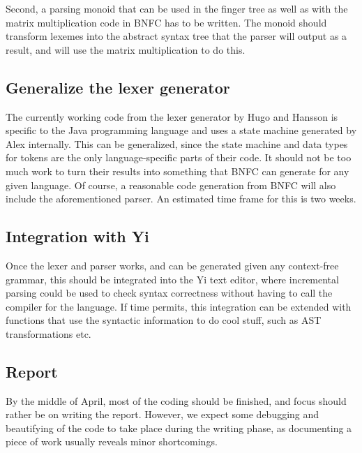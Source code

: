 \documentclass[a4paper,12pt]{article}
\begin{document}
Second, a parsing monoid that can be used in the finger tree as well as with the
matrix multiplication code in BNFC has to be written. The monoid should
transform lexemes into the abstract syntax tree that the parser will output as a
result, and will use the matrix multiplication to do this.

\subsection*{Generalize the lexer generator}
The currently working code from the lexer generator by Hugo and Hansson is
specific to the Java programming language and uses a state machine generated by
Alex internally. This can be generalized, since the state machine and data types
for tokens are the only language-specific parts of their code. It should not be
too much work to turn their results into something that BNFC can generate for
any given language. Of course, a reasonable code generation from BNFC will also
include the aforementioned parser. An estimated time frame for this is two
weeks.

\subsection*{Integration with Yi}
Once the lexer and parser works, and can be generated given any context-free
grammar, this should be integrated into the Yi text editor\cite{yieditor}, where
incremental parsing could be used to check syntax correctness without having to
call the compiler for the language. If time permits, this integration can be
extended with functions that use the syntactic information to do cool stuff,
such as AST transformations etc. 

\subsection*{Report}
By the middle of April, most of the coding should be finished, and focus should
rather be on writing the report. However, we expect some debugging and
beautifying of the code to take place during the writing phase, as documenting a
piece of work usually reveals minor shortcomings.
\end{document}
